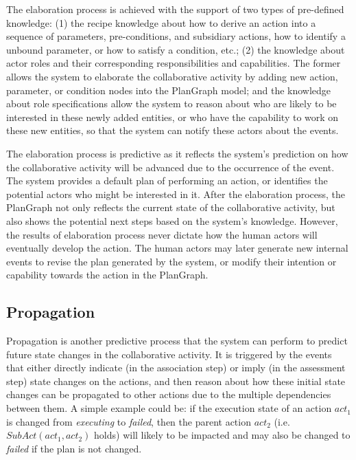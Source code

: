 The elaboration process is achieved with the support of two types of pre-defined knowledge: (1) the recipe knowledge about how to derive an action into a sequence of parameters, pre-conditions, and subsidiary actions, how to identify a unbound parameter, or how to satisfy a condition, etc.; (2) the knowledge about actor roles and their corresponding responsibilities and capabilities. The former allows the system to elaborate the collaborative activity by adding new action, parameter, or condition nodes into the PlanGraph model; and the knowledge about role specifications allow the system to reason about who are likely to be interested in these newly added entities, or who have the capability to work on these new entities, so that the system can notify these actors about the events.

The elaboration process is predictive as it reflects the system's prediction on how the collaborative activity will be advanced due to the occurrence of the event. The system provides a default plan of performing an action, or identifies the potential actors who might be interested in it. After the elaboration process, the PlanGraph not only reflects the current state of the collaborative activity, but also shows the potential next steps based on the system's knowledge. However, the results of elaboration process never dictate how the human actors will eventually develop the action. The human actors may later generate new internal events to revise the plan generated by the system, or modify their intention or capability towards the action in the PlanGraph.
\subsection{Propagation} %
\label{sub:propagation}
Propagation is another predictive process that the system can perform to predict future state changes in the collaborative activity. It is triggered by the events that either directly indicate (in the association step) or imply (in the assessment step) state changes on the actions, and then reason about how these initial state changes can be propagated to other actions due to the multiple dependencies between them. A simple example could be: if the execution state of an action $act_1$ is changed from \emph{executing} to \emph{failed}, then the parent action $act_2$ (i.e. $SubAct(act_1, act_2)$ holds) will likely to be impacted and may also be changed to \emph{failed} if the plan is not changed. 

